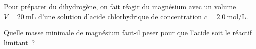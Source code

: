 Pour préparer du dihydrogène, on fait réagir du magnésium avec un volume
$V=\qty{20}{\mL}$ d'une solution d'acide chlorhydrique de concentration
$c=\qty{2.0}{\mol\per\L}$.

Quelle masse minimale de magnésium faut-il peser pour que l'acide soit le
réactif limitant~?


